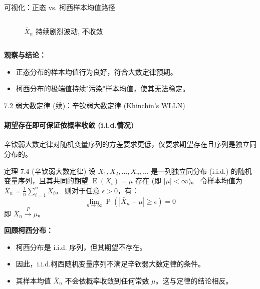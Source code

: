 \documentclass[UTF8]{beamer}
\DeclareMathOperator{\E}{\operatorname{E}}
\DeclareMathOperator{\Prob}{\operatorname{P}}
\begin{document}
\begin{frame}[shrink=10]{可视化：正态 vs. 柯西样本均值路径}
\begin{columns}[T]
\begin{column}{0.5\textwidth}
\begin{figure}
                \caption{$\bar{X}_n$ 持续剧烈波动, \alert{不收敛}}
            \end{figure}
        \end{column}
    \end{columns}
    \vspace{0.2cm}
    \textbf{观察与结论：}
    \begin{itemize}
        \item 正态分布的样本均值行为良好，符合大数定律预期。
        \item 柯西分布的极端值持续"污染"样本均值，使其无法稳定。
    \end{itemize}
\end{frame}

\begin{frame}[shrink=10]{7.2 弱大数定律 (续)：辛钦弱大数定律 (Khinchin's WLLN)}
    \framesubtitle{期望存在即可保证依概率收敛 (i.i.d.情况)}
    辛钦弱大数定律对随机变量序列的方差要求更低，仅要求期望存在且序列是独立同分布的。
    \vspace{0.3cm}
    \begin{block}{定理 7.4 (辛钦弱大数定律)} %
        设 $X_1, X_2, \dots, X_n, \dots$ 是一列\alert{独立同分布 (i.i.d.)} 的随机变量序列，且其共同的期望 $\E(X_i) = \mu$ \alert{存在} (即 $|\mu| < \infty$)。
        令样本均值为 $\bar{X}_n = \frac{1}{n} \sum_{i=1}^{n} X_i$。
        则对于任意 $\epsilon > 0$，有：
        \[ \lim_{n \to \infty} \Prob(|\bar{X}_n - \mu| \geq \epsilon) = 0 \]
        即 $\bar{X}_n \xrightarrow{P} \mu$。
    \end{block}
    \vspace{0.3cm}
    \textbf{回顾柯西分布：}
    \begin{itemize}
        \item 柯西分布是 i.i.d. 序列，但其期望\alert{不存在}。
        \item 因此，i.i.d.柯西随机变量序列\alert{不满足}辛钦弱大数定律的条件。
        \item 其样本均值 $\bar{X}_n$ \alert{不会}依概率收敛到任何常数 $\mu$。这与定律的结论相反。
    \end{itemize}
\end{frame}
\end{document}
